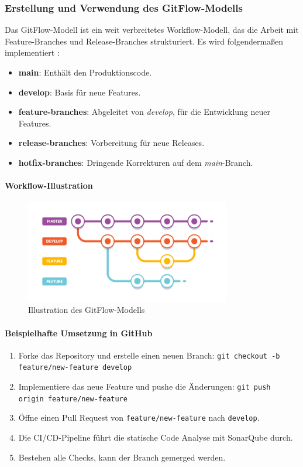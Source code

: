 \subsubsection{Erstellung und Verwendung des GitFlow-Modells}

Das GitFlow-Modell ist ein weit verbreitetes Workflow-Modell, das die Arbeit mit Feature-Branches und Release-Branches strukturiert. Es wird folgendermaßen implementiert \cite{Driessen2010}:

\begin{itemize}
    \item \textbf{main}: Enthält den Produktionscode.
    \item \textbf{develop}: Basis für neue Features.
    \item \textbf{feature-branches}: Abgeleitet von \textit{develop}, für die Entwicklung neuer Features.
    \item \textbf{release-branches}: Vorbereitung für neue Releases.
    \item \textbf{hotfix-branches}: Dringende Korrekturen auf dem \textit{main}-Branch.
\end{itemize}

\paragraph{Workflow-Illustration}

\begin{figure}[h!]
\centering
\includegraphics[width=0.8\textwidth]{img/gitflow_workflow.png}
\caption{Illustration des GitFlow-Modells}
\label{fig:gitflow}
\end{figure}

\paragraph{Beispielhafte Umsetzung in GitHub}

\begin{enumerate}
    \item Forke das Repository und erstelle einen neuen Branch: \texttt{git checkout -b feature/new-feature develop}
    \item Implementiere das neue Feature und pushe die Änderungen: \texttt{git push origin feature/new-feature}
    \item Öffne einen Pull Request von \texttt{feature/new-feature} nach \texttt{develop}.
    \item Die CI/CD-Pipeline führt die statische Code Analyse mit SonarQube durch.
    \item Bestehen alle Checks, kann der Branch gemerged werden.
\end{enumerate}


